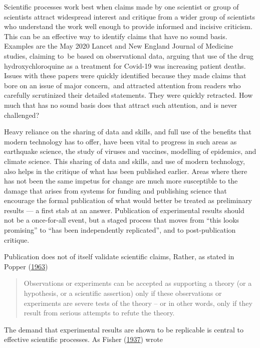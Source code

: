 \documentclass[
  10pt,
  b5paper]{book}
\begin{document}
Scientific processes work best when claims made by one scientist
or group of scientists attract widespread interest and critique
from a wider group of scientists who understand the work well
enough to provide informed and incisive criticism. This can be
an effective way to identify claims that have no sound basis.
Examples are the May 2020 Lancet and New England Journal of
Medicine studies, claiming to~be based on observational data,
arguing that use of the drug hydroxychloroquine as a treatment
for Covid-19 was increasing patient deaths.\\
Issues with these papers were quickly identified because they
made claims that bore on an issue of major concern,~and attracted
attention from readers who carefully scrutinized their detailed
statements. They were quickly retracted. How much that has no
sound basis does that attract such attention, and is never
challenged?

Heavy reliance on the sharing of data and skills, and full use of
the benefits that modern technology has to offer, have been vital
to progress in such areas as earthquake science, the study of
viruses and vaccines, modelling of epidemics, and climate science.
This sharing of data and skills, and use of modern technology, also
helps in the critique of what has been published earlier.
Areas where there has not been the same impetus for change are much
more susceptible to the damage that arises from systems for funding
and publishing science that encourage the formal publication of
what would better be treated as preliminary results --- a first
stab at an answer. Publication of experimental results should not
be a once-for-all event, but a staged process that moves from
``this looks promising'' to ``has been independently replicated'',
and to post-publication critique.

Publication does not of itself validate scientific claims,
Rather, as stated in Popper (\protect\hyperlink{ref-popper_1963}{1963})

\begin{quote}
Observations or experiments can be accepted as supporting a theory (or a hypothesis, or a scientific assertion) only if these observations or experiments are severe tests of the theory -- or in other words, only if they result from serious attempts to refute the theory.
\end{quote}

The demand that experimental results are shown to be replicable is
central to effective scientific processes. As Fisher (\protect\hyperlink{ref-fisher_1937}{1937}) wrote
\end{document}
